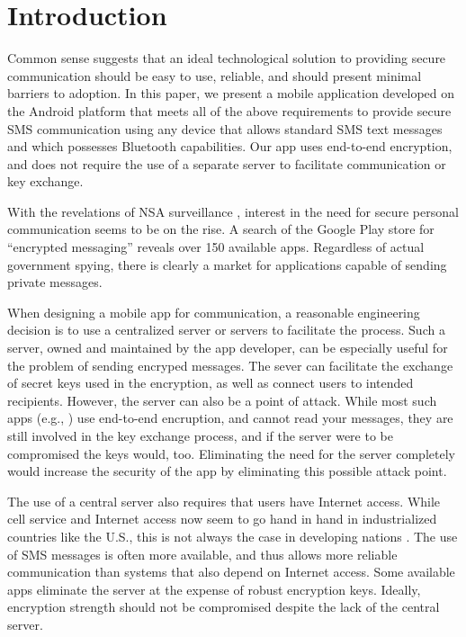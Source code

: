 \section{Introduction}
Common sense suggests that an ideal technological solution to providing secure communication
should be easy to use, reliable, and should present minimal barriers to adoption.
In this paper, we present a mobile application
developed on the Android platform that meets all of the above requirements to provide secure
SMS communication using any device that allows standard SMS text messages and which possesses
Bluetooth capabilities. Our app uses end-to-end encryption, and does not require the use of a
separate server to facilitate communication or key exchange.

With the revelations of NSA surveillance \cite{greenwald2014no}, interest in the need for
secure personal communication seems to be on the rise. A search of the Google Play store for
``encrypted messaging'' reveals over 150 available apps. Regardless of actual government
spying, there is clearly a market for applications capable of sending private messages.

When designing a mobile app for communication, a reasonable engineering decision is to use a
centralized server or servers to facilitate the process. Such a server, owned and maintained by
the app developer, can be especially useful for the problem of sending encryped messages. The
sever can facilitate the exchange of secret keys used in the encryption, as well as connect users
to intended recipients. However, the server can also be a point of attack. While most such apps
(e.g., \cite {textsecure, surespot}) use end-to-end encruption, and cannot read your messages,
they are still involved in the key exchange process, and if the server were to be compromised
the keys would, too. Eliminating the need for the server completely would increase the security of
the app by eliminating this possible attack point.

The use of a central server also requires that users have Internet access. While cell service
and Internet access now seem to go hand in hand in industrialized countries like the U.S.,
this is not always the case in developing nations \cite{Talukder:2010:MWU:1746740.1747015}.
The use of SMS messages is often more available, and thus allows more reliable communication than
systems that also depend on Internet access. Some available apps \cite{TXTCrypt} eliminate the
server at the expense of robust encryption keys. Ideally, encryption strength should not be
compromised despite the lack of the central server.

